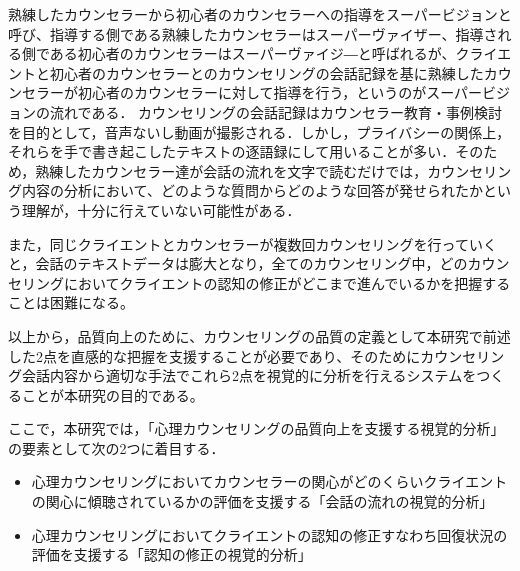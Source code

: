 \documentclass[shuuron]{kuee}
\begin{document}
熟練したカウンセラーから初心者のカウンセラーへの指導をスーパービジョンと呼び、指導する側である熟練したカウンセラーはスーパーヴァイザー、指導される側である初心者のカウンセラーはスーパーヴァイジ―と呼ばれるが、クライエントと初心者のカウンセラーとのカウンセリングの会話記録を基に熟練したカウンセラーが初心者のカウンセラーに対して指導を行う，というのがスーパービジョンの流れである．
カウンセリングの会話記録はカウンセラー教育・事例検討を目的として，音声ないし動画が撮影される．しかし，プライバシーの関係上，それらを手で書き起こしたテキストの逐語録にして用いることが多い．そのため，熟練したカウンセラー達が会話の流れを文字で読むだけでは，カウンセリング内容の分析において、どのような質問からどのような回答が発せられたかという理解が，十分に行えていない可能性がある．


また，同じクライエントとカウンセラーが複数回カウンセリングを行っていくと，会話のテキストデータは膨大となり，全てのカウンセリング中，どのカウンセリングにおいてクライエントの認知の修正がどこまで進んでいるかを把握することは困難になる。%


以上から，品質向上のために、カウンセリングの品質の定義として本研究で前述した2点を直感的な把握を支援することが必要であり、そのためにカウンセリング会話内容から適切な手法でこれら2点を視覚的に分析を行えるシステムをつくることが本研究の目的である。
%




ここで，本研究では，「心理カウンセリングの品質向上を支援する視覚的分析」の要素として次の2つに着目する．
\begin{itemize}
  \item 心理カウンセリングにおいてカウンセラーの関心がどのくらいクライエントの関心に傾聴されているかの評価を支援する「会話の流れの視覚的分析」
  \item 心理カウンセリングにおいてクライエントの認知の修正すなわち回復状況の評価を支援する「認知の修正の視覚的分析」
\end{itemize}
\end{document}
